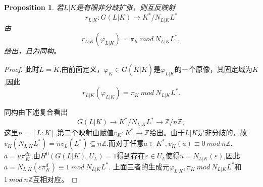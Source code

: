\documentclass[UTF8]{article}
\newtheorem{prop}{Proposition}[section]
\begin{document}
\begin{prop}
	若$L|K$是有限非分歧扩张，则互反映射
	$$r_{L|K}:G(L|K)\rightarrow K^{*}/N_{L|K}L^{*}$$
	由
	$$r_{L|K}(\varphi_{L|K})=\pi_{K}\ mod \ N_{L|K}L^{*},$$
	给出，且为同构。
\end{prop}
\begin{proof}
	此时$\widetilde{L}=\widetilde{K}$,由前面定义，$\varphi_{K}\in G(\widetilde{K}|K)$是$\varphi_{L|K}$的一个原像，其固定域为$K$,因此$$r_{L|K}(\varphi_{L|K})=\pi_{K}\ mod \ N_{L|K}L^{*}.$$
	
	同构由下述复合看出
	$$
	G(L|K)\rightarrow K^{*}/N_{L|K}L^{*}\rightarrow \mathbb{Z}/n\mathbb{Z},
	$$
	这里$n=[L:K]$,第二个映射由赋值$v_{K}:K^{*}\rightarrow \mathbb{Z}$给出。由于$L|K$是非分歧的，故$v_{K}(N_{L|K}L^{*})=nv_{L}(L^{*})\subseteq n\mathbb{Z}$.而对于任意$a\in K^{*},v_{K}(a)\equiv 0\ mod \ n\mathbb{Z}$,$a=u\pi_{K}^{dn}$,由$H^{0}(G(L|K),U_{L})=1$得到存在$\varepsilon\in U_{L}$使得$u=N_{L|K}(\varepsilon)$,因此
	$a=N_{L|K}(\varepsilon\pi_{K}^{d})\equiv 1\ mod \ N_{L|K}L^{*}$.
	上面三者的生成元$\varphi_{L|K},\pi_{K}\ mod \ N_{L|K}L^{*}$和$1\ mod \ n\mathbb{Z}$互相对应。
\end{proof}
\end{document}
